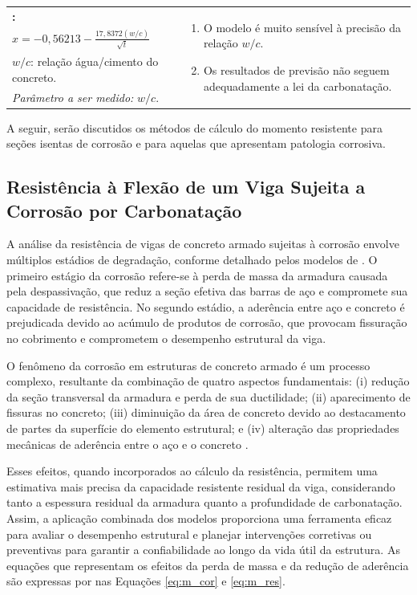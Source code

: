 \begin{table}[H]
\begin{tabular}{p{} p{}}
\textbf{\textcite{article}:} &
\multirow{4}{6cm}[0pt]{%
\begin{enumerate}[leftmargin=*]
\item O modelo é muito sensível à precisão da relação $w/c$.
\item Os resultados de previsão não seguem adequadamente a lei da carbonatação.
\end{enumerate}} \\[1mm]
$x = -0{,}56213 - \frac{17{,}8372(w/c)}{\sqrt{t}}$ \\[0.5mm]
$w/c$: relação água/cimento do concreto. \\[0.5mm]
\textit{Parâmetro a ser medido:} $w/c$. \\[0.5mm]
\bottomrule
\end{tabular}
\end{table}

A seguir, serão discutidos os métodos de cálculo do momento resistente para seções isentas de corrosão e para aquelas que apresentam patologia corrosiva.

\subsection{Resistência à Flexão de um Viga Sujeita a Corrosão por Carbonatação}

A análise da resistência de vigas de concreto armado sujeitas à corrosão envolve múltiplos estádios de degradação, conforme detalhado pelos modelos de \textcite{possan_co2_2016, Azad2010}. O primeiro estágio da corrosão refere-se à perda de massa da armadura causada pela despassivação, que reduz a seção efetiva das barras de aço e compromete sua capacidade de resistência. No segundo estádio, a aderência entre aço e concreto é prejudicada devido ao acúmulo de produtos de corrosão, que provocam fissuração no cobrimento e comprometem o desempenho estrutural da viga. 

O fenômeno da corrosão em estruturas de concreto armado é um processo complexo, resultante da combinação de quatro aspectos fundamentais: (i) redução da seção transversal da armadura e perda de sua ductilidade; (ii) aparecimento de fissuras no concreto; (iii) diminuição da área de concreto devido ao destacamento de partes da superfície do elemento estrutural; e (iv) alteração das propriedades mecânicas de aderência entre o aço e o concreto \cite{kagermanov_overview_2023}.

Esses efeitos, quando incorporados ao cálculo da resistência, permitem uma estimativa mais precisa da capacidade resistente residual da viga, considerando tanto a espessura residual da armadura quanto a profundidade de carbonatação. Assim, a aplicação combinada dos modelos proporciona uma ferramenta eficaz para avaliar o desempenho estrutural e planejar intervenções corretivas ou preventivas para garantir a confiabilidade ao longo da vida útil da estrutura. As equações que representam os efeitos da perda de massa e da redução de aderência são expressas por \textcite{Azad2010} nas Equações \eqref{eq:m_cor} e \eqref{eq:m_res}.

